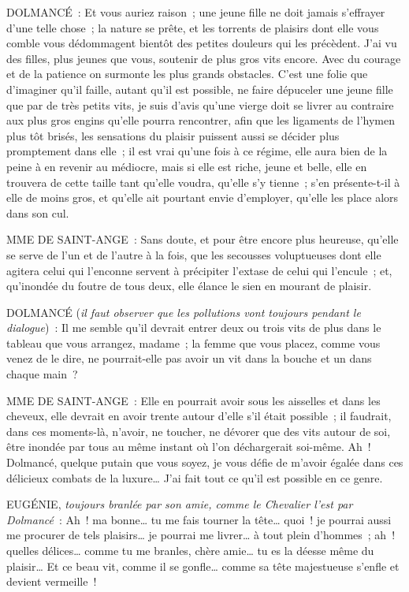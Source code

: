 \documentclass[french,twoside]{book} %
\begin{document}
DOLMANCÉ : Et vous auriez raison ; une jeune fille ne doit jamais s’effrayer d’une telle chose ; la nature se prête, et les torrents de plaisirs dont elle vous comble vous dédommagent bientôt des petites douleurs qui les précèdent. J’ai vu des filles, plus jeunes que vous, soutenir de plus gros vits encore. Avec du courage et de la patience on surmonte les plus grands obstacles. C’est une folie que d’imaginer qu’il faille, autant qu’il est possible, ne faire dépuceler une jeune fille que par de très petits vits, je suis d’avis qu’une vierge doit se livrer au contraire aux plus gros engins qu’elle pourra rencontrer, afin que les ligaments de l’hymen plus tôt brisés, les sensations du plaisir puissent aussi se décider plus promptement dans elle ; il est vrai qu’une fois à ce régime, elle aura bien de la peine à en revenir au médiocre, mais si elle est riche, jeune et belle, elle en trouvera de cette taille tant qu’elle voudra, qu’elle s’y tienne ; s’en présente-t-il à elle de moins gros, et qu’elle ait pourtant envie d’employer, qu’elle les place alors dans son cul.\par
MME DE SAINT-ANGE : Sans doute, et pour être encore plus heureuse, qu’elle se serve de l’un et de l’autre à la fois, que les secousses voluptueuses dont elle agitera celui qui l’enconne servent à précipiter l’extase de celui qui l’encule ; et, qu’inondée du foutre de tous deux, elle élance le sien en mourant de plaisir.\par
DOLMANCÉ ({\itshape il faut observer que les pollutions vont toujours pendant le dialogue}) : Il me semble qu’il devrait entrer deux ou trois vits de plus dans le tableau que vous arrangez, madame ; la femme que vous placez, comme vous venez de le dire, ne pourrait-elle pas avoir un vit dans la bouche et un dans chaque main ?\par
MME DE SAINT-ANGE : Elle en pourrait avoir sous les aisselles et dans les cheveux, elle devrait en avoir trente autour d’elle s’il était possible ; il faudrait, dans ces moments-là, n’avoir, ne toucher, ne dévorer que des vits autour de soi, être inondée par tous au même instant où l’on déchargerait soi-même. Ah ! Dolmancé, quelque putain que vous soyez, je vous défie de m’avoir égalée dans ces délicieux combats de la luxure… J’ai fait tout ce qu’il est possible en ce genre.\par
EUGÉNIE, {\itshape toujours branlée par son amie, comme le Chevalier l’est par Dolmancé} : Ah ! ma bonne… tu me fais tourner la tête… quoi ! je pourrai aussi me procurer de tels plaisirs… je pourrai me livrer… à tout plein d’hommes ; ah ! quelles délices… comme tu me branles, chère amie… tu es la déesse même du plaisir… Et ce beau vit, comme il se gonfle… comme sa tête majestueuse s’enfle et devient vermeille !\par
\end{document}
